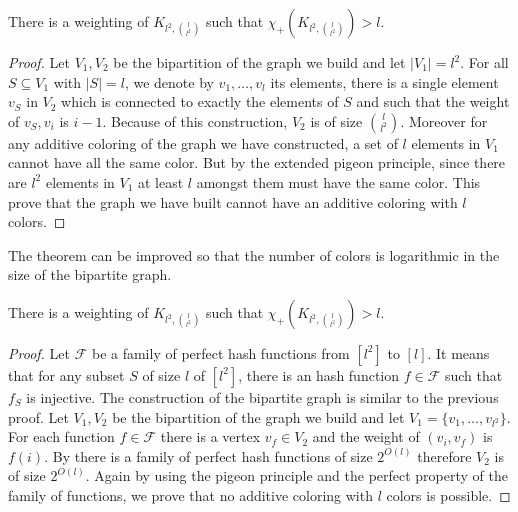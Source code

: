 \documentclass{article}
\begin{document}
{\begin{theorem}
 There is a weighting of $K_{l^2,\binom{l}{l^2}}$ such that 
 $\chi_{+}(K_{l^2,\binom{l}{l^2}}) > l$.
\end{theorem}

\begin{proof}
Let $V_1, V_2$ be the bipartition of the graph we build and let $|V_1| = l^2$. 
For all $S \subseteq V_1$ with $|S| = l$, we denote by $v_1,\dots,v_l$ its elements,
there is a single element $v_S$ in $V_2$ which is connected to exactly the elements of $S$
and such that the weight of $v_S,v_i$ is $i-1$. Because of this construction, $V_2$ is of size
$\binom{l}{l^2}$. Moreover for any additive coloring of the graph we have constructed,
a set of $l$ elements in $V_1$ cannot have all the same color. But by the extended pigeon principle, since there 
are $l^2$ elements in $V_1$ at least $l$ amongst them must have the same color. 
This prove that the graph we have built cannot have an additive coloring with $l$ colors.
\end{proof}

The theorem can be improved so that the number of colors is logarithmic in 
the size of the bipartite graph.

\begin{theorem}
 There is a weighting of $K_{l^2,\binom{l}{l^2}}$ such that 
 $\chi_{+}(K_{l^2,\binom{l}{l^2}}) > l$.
\end{theorem}

\begin{proof}
 Let $\mathcal{F}$ be a family of perfect  hash functions from $[l^2]$ to $[l]$. It means that for any 
 subset $S$ of size $l$ of $[l^2]$, there is an hash function $f \in \mathcal{F}$ such that $f_S$ is injective.
 The construction of the bipartite graph is similar to the previous proof. 
 Let $V_1, V_2$ be the bipartition of the graph we build and let $V_1 = \{v_1,\dots,v_{l^2}\}$. 
 For each function $f \in \mathcal{F}$ there is a vertex $v_f \in V_2$ and the weight of $(v_i,v_f)$ is $f(i)$.
 By \cite{schmidt1990spatial,alon1995color} there is a family of perfect hash functions of size $2^{O(l)}$ therefore $V_2$ is of size $2^{O(l)}$.
 Again by using the pigeon principle and the perfect property of the family of functions, we prove that no additive coloring with $l$ colors is possible.
\end{proof}


}
\end{document}
